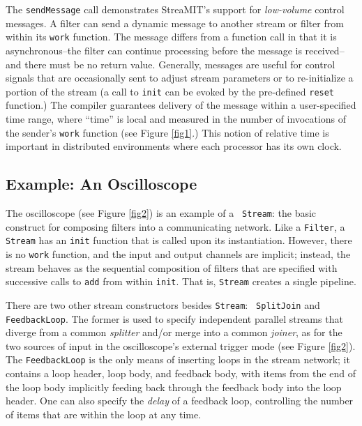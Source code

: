 \documentclass[10pt]{article}
\begin{document}
The {\tt sendMessage} call demonstrates StreaMIT's support for {\it
low-volume} control messages.  A filter can send a dynamic message to
another stream or filter from within its {\tt work} function.  The
message differs from a function call in that it is asynchronous--the
filter can continue processing before the message is received--and
there must be no return value.  Generally, messages are useful for
control signals that are occasionally sent to adjust stream parameters
or to re-initialize a portion of the stream (a call to {\tt init} can
be evoked by the pre-defined {\tt reset} function.)  The compiler
guarantees delivery of the message within a user-specified time range,
where ``time'' is local and measured in the number of invocations of
the sender's {\tt work} function (see Figure \ref{fig1}.)  This notion
of relative time is important in distributed environments where each
processor has its own clock.

\subsection{Example: An Oscilloscope}

The oscilloscope (see Figure \ref{fig2}) is an example of a {\tt
Stream}: the basic construct for composing filters into a
communicating network.  Like a {\tt Filter}, a {\tt Stream} has an
{\tt init} function that is called upon its instantiation.  However,
there is no {\tt work} function, and the input and output channels are
implicit; instead, the stream behaves as the sequential composition of
filters that are specified with successive calls to {\tt add} from
within {\tt init}.  That is, {\tt Stream} creates a single pipeline.

There are two other stream constructors besides {\tt Stream}: {\tt
SplitJoin} and {\tt FeedbackLoop}.  The former is used to specify
independent parallel streams that diverge from a common {\it splitter}
and/or merge into a common {\it joiner}, as for the two sources of
input in the oscilloscope's external trigger mode (see Figure
\ref{fig2}).  The {\tt FeedbackLoop} is the only means of inserting
loops in the stream network; it contains a loop header, loop body, and
feedback body, with items from the end of the loop body implicitly
feeding back through the feedback body into the loop header.  One can
also specify the {\it delay} of a feedback loop, controlling the
number of items that are within the loop at any time.
\end{document}
